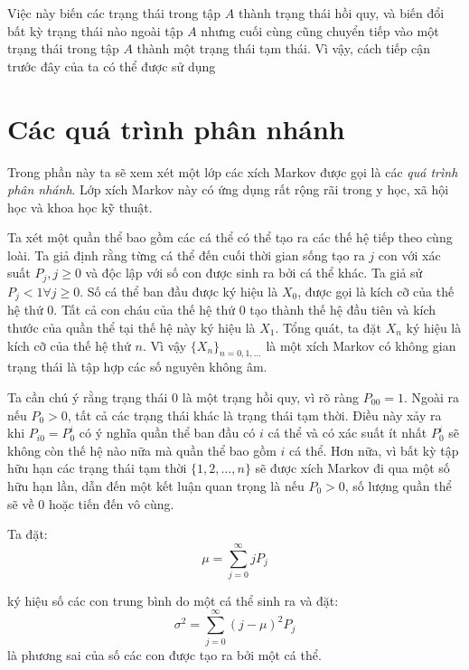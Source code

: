 \documentclass[14pt, a4paper]{article}
\numberwithin{equation}{section}
\numberwithin{figure}{section}
\theoremstyle{sltheorem}
\theoremstyle{soltheorem}
\numberwithin{dl}{section}
\numberwithin{md}{section}
\numberwithin{vd}{section}
\begin{document}
    Việc này biến các trạng thái trong tập $A$ thành trạng thái hồi quy, và biến đổi bất kỳ trạng thái nào ngoài tập $A$ nhưng cuối cùng cũng chuyển tiếp vào một trạng thái trong tập $A$ thành một trạng thái tạm thái.
    Vì vậy, cách tiếp cận trước đây của ta có thể được sử dụng
    
    \section{Các quá trình phân nhánh}
    
    Trong phần này ta sẽ xem xét một lớp các xích Markov được gọi là các \textit{quá trình phân nhánh}.
    Lớp xích Markov này có ứng dụng rất rộng rãi trong y học, xã hội học và khoa học kỹ thuật.
    
    Ta xét một quần thể bao gồm các cá thể có thể tạo ra các thế hệ tiếp theo cùng loài.
    Ta giả định rằng từng cá thể đến cuối thời gian sống tạo ra $j$ con với xác suất $P_j, j \geq 0$ và độc lập với số con được sinh ra bởi cá thể khác.
    Ta giả sử $P_j < 1 \forall j \geq 0$.
    Số cá thể ban đầu được ký hiệu là $X_0$, được gọi là kích cỡ của thế hệ thứ 0.
    Tất cả con cháu của thế hệ thứ 0 tạo thành thế hệ đầu tiên và kích thước của quần thể tại thế hệ này ký hiệu là $X_1$.
    Tổng quát, ta đặt $X_n$ ký hiệu là kích cỡ của thế hệ thứ $n$.
    Vì vậy $\lbrace X_n \rbrace_{n=0,1,\dots}$ là một xích Markov có không gian trạng thái là tập hợp các số nguyên không âm.
    
    Ta cần chú ý rằng trạng thái 0 là một trạng hồi quy, vì rõ ràng $P_{00}=1$.
    Ngoài ra nếu $P_0 > 0$, tất cả các trạng thái khác là trạng thái tạm thời.
    Điều này xảy ra khi $P_{i0}=P_0^i$ có ý nghĩa quần thể ban đầu có $i$ cá thể và có xác suất ít nhất $P_0^i$ sẽ không còn thế hệ nào nữa mà quần thể bao gồm $i$ cá thể.
    Hơn nữa, vì bất kỳ tập hữu hạn các trạng thái tạm thời $\lbrace 1, 2, \dots, n \rbrace$ sẽ được xích Markov đi qua một số hữu hạn lần, dẫn đến một kết luận quan trọng là nếu $P_0 > 0$, số lượng quần thể sẽ về 0 hoặc tiến đến vô cùng.
    
    Ta đặt:
    \begin{equation*}
        \mu = \sum_{j=0}^{\infty} j P_j
    \end{equation*}
    
    ký hiệu số các con trung bình do một cá thể sinh ra và đặt:
    \begin{equation*}
        \sigma^2 = \sum_{j=0}^{\infty} (j - \mu)^2 P_j
    \end{equation*}
    là phương sai của số các con được tạo ra bởi một cá thể.
    
\end{document}
